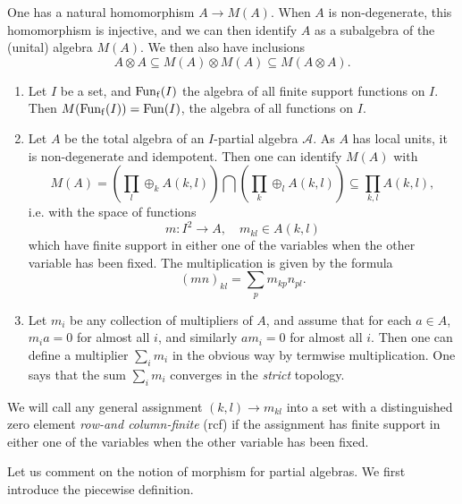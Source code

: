 One has a natural homomorphism $A\rightarrow M(A)$. When $A$ is non-degenerate,  this homomorphism is injective, and we can then identify $A$ as a subalgebra of the (unital) algebra $M(A)$. We then also have inclusions \[A\otimes A\subseteq M(A)\otimes M(A)\subseteq M(A\otimes A).\]

\begin{Exa}\label{ExaMult} \begin{enumerate}
\item Let $I$ be a set, and $\mathrm{Fun}_{\operatorname{\mathrm{f}}}(I)$ the algebra of all finite support functions on $I$. Then $M(\mathrm{Fun}_{\operatorname{\mathrm{f}}}(I)) = \mathrm{Fun}(I)$, the algebra of all functions on $I$. 
\item Let $A$ be the total algebra of an $I$-partial algebra $\mathscr{A}$. As $A$ has local units, it is non-degenerate and idempotent. Then one can identify $M(A)$ with \[M(A) = \left(\prod_l \oplus_k A(k,l)\right) \bigcap \left(\prod_k\oplus_l A(k,l)\right) \subseteq \prod_{k,l} A(k,l),\] i.e. with the space of functions \[m:I^2\rightarrow A,\quad m_{kl}\in A(k,l)\] which have finite support in either one of the variables when the other variable has been fixed. The multiplication is given by the formula \[(mn)_{kl} = \sum_p m_{kp}n_{pl}.\]
\item Let $m_i$ be any collection of multipliers of $A$, and assume that for each $a\in A$, $m_ia =0$ for almost all $i$, and similarly $am_i=0$ for almost all $i$. Then one can define a multiplier $\sum_i m_i$ in the obvious way by termwise multiplication. One says that the sum $\sum_i m_i$ converges in the \emph{strict} topology. 
\end{enumerate}
\end{Exa}

\begin{Rem} We will call any general assignment $(k,l)\rightarrow m_{kl}$ into a set with a distinguished zero element \emph{row-and column-finite} (rcf) if the assignment has finite support in either one of the variables when the other variable has been fixed. %
\end{Rem} 

Let us comment on the notion of morphism for partial algebras. We first introduce the piecewise definition.

